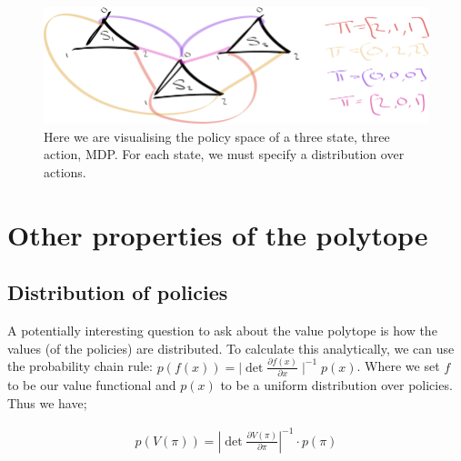 \begin{figure}[h]
\centering
\includegraphics[width=1\textwidth,height=0.25\textheight]{../../pictures/drawings/3-state-3-action-simplices.png}
\caption{Here we are visualising the policy space of a three state, three action, MDP.
For each state, we must specify a distribution over actions.}
\end{figure}

\newpage

\section{Other properties of the polytope} \label{polytope-extras}



\subsection{Distribution of policies}

A potentially interesting question to ask about the value polytope is how the
values (of the policies) are distributed. To calculate this
analytically, we can use the probability chain rule:
\(p(f(x)) = \mid \det\frac{\partial f(x)}{\partial x}\mid^{-1}p(x)\).
Where we set \(f\) to be our value functional and \(p(x)\) to be a
uniform distribution over policies. Thus we have;

\begin{align}
p(V(\pi)) = |\det \frac{\partial V(\pi)}{\partial \pi}|^{-1} \cdot p(\pi) \tag{density}
\end{align}

